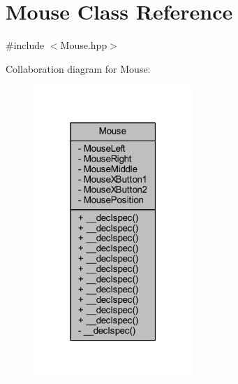 \hypertarget{class_mouse}{\section{Mouse Class Reference}
\label{class_mouse}
}


{\ttfamily \#include $<$Mouse.\-hpp$>$}



Collaboration diagram for Mouse\-:\nopagebreak
\begin{figure}[H]
\begin{center}
\leavevmode
\includegraphics[width=171pt]{class_mouse__coll__graph}
\end{center}
\end{figure}
